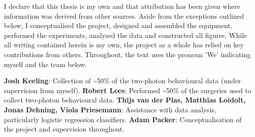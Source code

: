 I declare that this thesis is my own and that attribution has been given where information was derived from other sources. Aside from the exceptions outlined below, I conceptualised the project, designed and assembled the equipment, performed the experiments, analysed the data and constructed all figures. While all writing contained herein is my own, the project as a whole has relied on key contributions from others. Throughout, the text uses the pronoun 'We' indicating myself and the team below.

\textbf{Josh Keeling}: Collection of \textasciitilde 50\% of the two-photon behavioural data (under supervision from myself). \newline \textbf{Robert Lees}: Performed \textasciitilde 50\% of the surgeries used to collect two-photon behavioural data.  \newline \textbf{Thijs van der Plas, Matthias Loidolt, Jonas Dehning, Viola Priesemann}: Assistance with data analysis, particularly logistic regression classifiers.  \newline \textbf{Adam Packer}: Conceptualisation of the project and supervision throughout.
